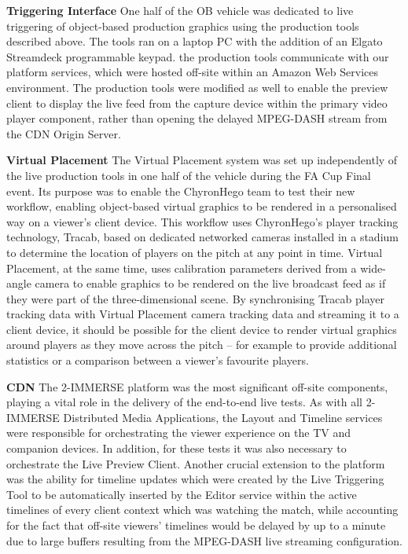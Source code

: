 \documentclass[sigchi-a, authorversion]{acmart}
\begin{document}
\textbf{Triggering Interface} One half of the OB vehicle was dedicated to live triggering of object-based production graphics using the production tools described above. The tools ran on a laptop PC with the addition of an Elgato Streamdeck programmable keypad. the production tools communicate with our platform services, which were hosted off-site within an Amazon Web Services environment. The production tools were modified as well to enable the preview client to display the live feed from the capture device within the primary video player component, rather than opening the delayed MPEG-DASH stream from the CDN Origin Server.

\textbf{Virtual Placement} The Virtual Placement system was set up independently of the live production tools in one half of the vehicle during the FA Cup Final event. Its purpose was to enable the ChyronHego team to test their new workflow, enabling object-based virtual graphics to be rendered in a personalised way on a viewer's client device. This workflow uses ChyronHego's player tracking technology, Tracab, based on dedicated networked cameras installed in a stadium to determine the location of players on the pitch at any point in time. Virtual Placement, at the same time, uses calibration parameters derived from a wide-angle camera to enable graphics to be rendered on the live broadcast feed as if they were part of the three-dimensional scene. By synchronising Tracab player tracking data with Virtual Placement camera tracking data and streaming it to a client device, it should be possible for the client device to render virtual graphics around players as they move across the pitch – for example to provide additional statistics or a comparison between a viewer’s favourite players.

\textbf{CDN} The 2-IMMERSE platform \cite{kegel2017} was the most significant off-site components, playing a vital role in the delivery of the end-to-end live tests. As with all 2-IMMERSE Distributed Media Applications, the Layout and Timeline services were responsible for orchestrating the viewer experience on the TV and companion devices. In addition, for these tests it was also necessary to orchestrate the Live Preview Client. Another crucial extension to the platform was the ability for timeline updates which were created by the Live Triggering Tool to be automatically inserted by the Editor service within the active timelines of every client context which was watching the match, while accounting for the fact that off-site viewers' timelines would be delayed by up to a minute due to large buffers resulting from the MPEG-DASH live streaming configuration.
\end{document}

